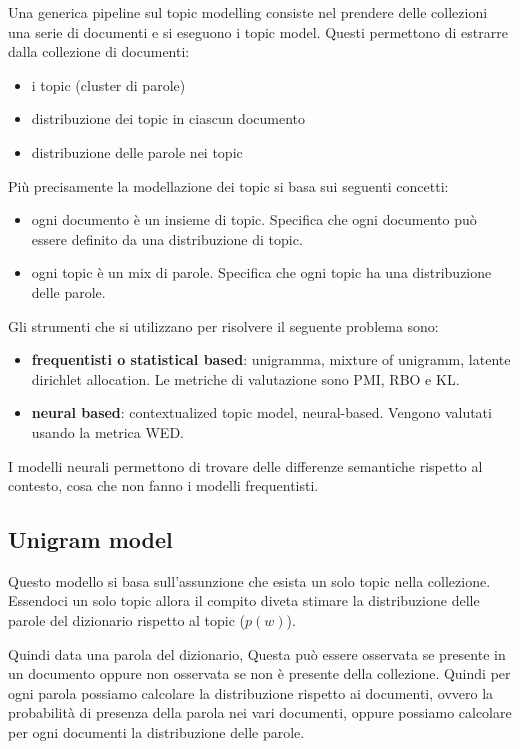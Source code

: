 Una generica pipeline sul topic modelling consiste nel prendere delle collezioni
una serie di documenti e si eseguono i topic model.
Questi permettono di estrarre dalla collezione di documenti:
\begin{itemize}
      \item i topic (cluster di parole)
      \item distribuzione dei topic in ciascun documento
      \item distribuzione delle parole nei topic
\end{itemize} 

Più precisamente la modellazione dei topic si basa sui seguenti concetti:
\begin{itemize}
      \item ogni documento è un insieme di topic. Specifica che ogni documento 
      può essere definito da una distribuzione di topic.
      \item ogni topic è un mix di parole. Specifica che ogni topic ha una distribuzione 
      delle parole.
\end{itemize}

Gli strumenti che si utilizzano per risolvere il seguente problema sono:
\begin{itemize}
      \item \textbf{frequentisti o statistical based}: unigramma, mixture of unigramm, latente dirichlet allocation.
      Le metriche di valutazione sono PMI, RBO e KL.
      \item \textbf{neural based}: contextualized topic model, neural-based. Vengono 
      valutati usando la metrica WED.
\end{itemize}

I modelli neurali permettono di trovare delle differenze semantiche rispetto al 
contesto, cosa che non fanno i modelli frequentisti.

\subsection{Unigram model}
Questo modello si basa sull'assunzione che esista un solo topic nella collezione.
Essendoci un solo topic allora il compito diveta stimare la distribuzione delle 
parole del dizionario rispetto al topic ($p(w)$).

Quindi data una parola del dizionario, Questa può essere osservata se presente 
in un documento oppure non osservata se non è presente della collezione. 
Quindi per ogni parola possiamo calcolare la distribuzione rispetto ai documenti,
ovvero la probabilità di presenza della parola nei vari documenti, oppure possiamo 
calcolare per ogni documenti la distribuzione delle parole. 

